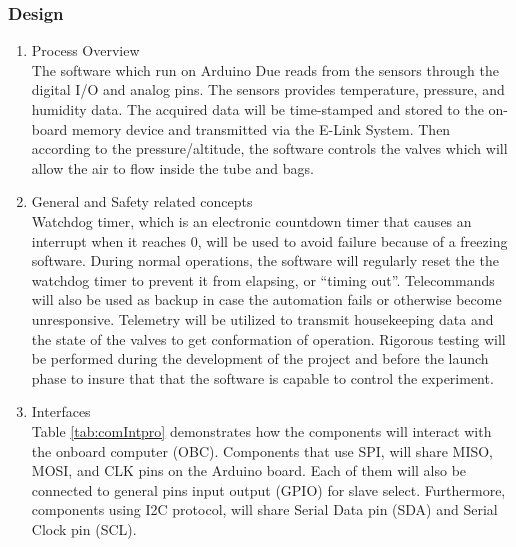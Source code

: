 \documentclass[a4paper,12pt,twoside]{article}
\begin{document}
\subsubsection{Design}
\begin{enumerate}[label=(\alph*)]
\item{Process Overview}\\
The software which run on Arduino Due reads from the sensors through the digital I/O and analog pins. The sensors provides temperature, pressure, and humidity data. The acquired data will be time-stamped and stored to the on-board memory device and transmitted via the E-Link System. Then according to the pressure/altitude, the software controls the valves which will allow the air to flow inside the tube and bags.
\item{General and Safety related concepts}\\
Watchdog timer, which is an electronic countdown timer that causes an interrupt when it reaches 0, will be used to avoid failure because of a freezing software. During normal operations, the software will regularly reset the the watchdog timer to prevent it from elapsing, or \enquote{timing out}. Telecommands will also be used as backup in case the automation fails or otherwise become unresponsive. Telemetry will be utilized to transmit housekeeping data and the state of the valves to get conformation of operation. Rigorous testing will be performed during the development of the project and before the launch phase to insure that that the software is capable to control the experiment.
\item{Interfaces}\\
Table \ref{tab:comIntpro} demonstrates how the components will interact with the onboard computer (OBC). Components that use SPI, will share MISO, MOSI, and CLK pins on the Arduino board. Each of them will also be connected to general pins input output (GPIO) for slave select. Furthermore, components using I2C protocol, will share Serial Data pin (SDA) and Serial Clock pin (SCL).


\end{enumerate}
\end{document}
